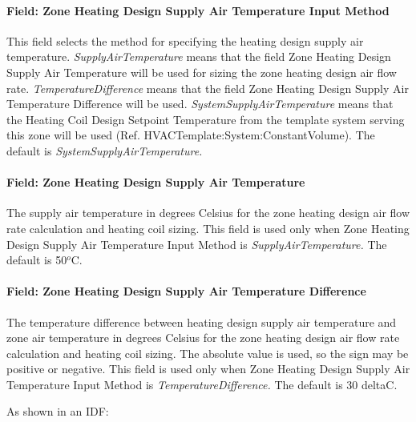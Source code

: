 \paragraph{Field: Zone Heating Design Supply Air Temperature Input Method}\label{field-zone-heating-design-supply-air-temperature-input-method-9}

This field selects the method for specifying the heating design supply air temperature. \emph{SupplyAirTemperature} means that the field Zone Heating Design Supply Air Temperature will be used for sizing the zone heating design air flow rate. \emph{TemperatureDifference} means that the field Zone Heating Design Supply Air Temperature Difference will be used. \emph{SystemSupplyAirTemperature} means that the Heating Coil Design Setpoint Temperature from the template system serving this zone will be used (Ref. HVACTemplate:System:ConstantVolume). The default is \emph{SystemSupplyAirTemperature.}

\paragraph{Field: Zone Heating Design Supply Air Temperature}\label{field-zone-heating-design-supply-air-temperature-8}

The supply air temperature in degrees Celsius for the zone heating design air flow rate calculation and heating coil sizing. This field is used only when Zone Heating Design Supply Air Temperature Input Method is \emph{SupplyAirTemperature.} The default is 50\(^{o}\)C.

\paragraph{Field: Zone Heating Design Supply Air Temperature Difference}\label{field-zone-heating-design-supply-air-temperature-difference-9}

The temperature difference between heating design supply air temperature and zone air temperature in degrees Celsius for the zone heating design air flow rate calculation and heating coil sizing. The absolute value is used, so the sign may be positive or negative. This field is used only when Zone Heating Design Supply Air Temperature Input Method is \emph{TemperatureDifference.} The default is 30 deltaC.

As shown in an IDF:

